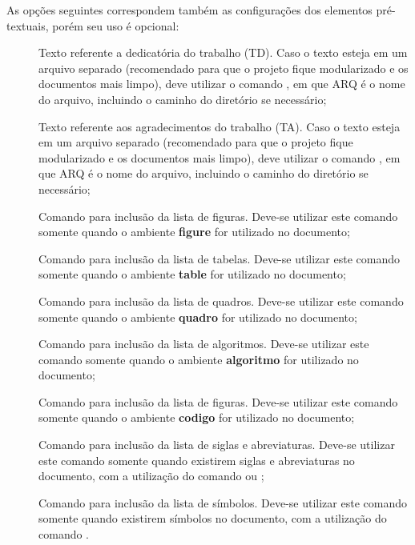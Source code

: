 As opções seguintes correspondem também as configurações dos elementos pré-textuais, porém seu uso é opcional: 

\begin{description}

 \item[] Texto referente a dedicatória do trabalho (TD). Caso o texto esteja em um arquivo separado (recomendado para que o projeto fique modularizado e os documentos mais limpo), deve utilizar o comando , em que ARQ é o nome do arquivo, incluindo o caminho do diretório se necessário;

 \item[] Texto referente aos agradecimentos do trabalho (TA). Caso o texto esteja em um arquivo separado (recomendado para que o projeto fique modularizado e os documentos mais limpo), deve utilizar o comando , em que ARQ é o nome do arquivo, incluindo o caminho do diretório se necessário;

 \item[] Comando para inclusão da lista de figuras. Deve-se utilizar este comando somente quando o ambiente \textbf{figure} for utilizado no documento;
 
 \item[] Comando para inclusão da lista de tabelas. Deve-se utilizar este comando somente quando o ambiente \textbf{table} for utilizado no documento;
  
 \item[] Comando para inclusão da lista de quadros. Deve-se utilizar este comando somente quando o ambiente \textbf{quadro} for utilizado no documento;
   
 \item[] Comando para inclusão da lista de algoritmos. Deve-se utilizar este comando somente quando o ambiente \textbf{algoritmo} for utilizado no documento;
    
 \item[] Comando para inclusão da lista de figuras. Deve-se utilizar este comando somente quando o ambiente \textbf{codigo} for utilizado no documento;
 
 \item[] Comando para inclusão da lista de siglas e abreviaturas. Deve-se utilizar este comando somente quando existirem siglas e abreviaturas no documento, com a utilização do comando  ou ;

 \item[] Comando para inclusão da lista de símbolos. Deve-se utilizar este comando somente quando existirem símbolos no documento, com a utilização do comando .
 
\end{description}